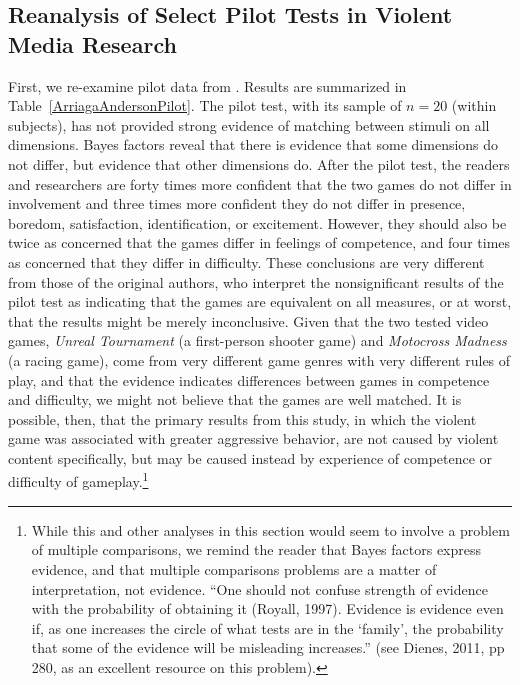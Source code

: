 \documentclass[man]{apa6}
\begin{document}
\subsection{Reanalysis of Select Pilot Tests in Violent Media Research}
First, we re-examine pilot data from \citet{Arriaga:etal:2008}. Results are summarized in Table~\ref{ArriagaAndersonPilot}. The pilot test, with its sample of $n = 20$ (within subjects), has not provided strong evidence of matching between stimuli on all dimensions. Bayes factors reveal that there is evidence that some dimensions do not differ, but evidence that other dimensions do. After the pilot test, the readers and researchers %
are forty times more confident that the two games do not differ in involvement and three times more confident they do not differ in presence, boredom, satisfaction, identification, or excitement. However, they should also be twice as concerned that the games differ in feelings of competence, and four times as concerned that they differ in difficulty. These conclusions are very different from those of the original authors, who interpret the nonsignificant results of the pilot test as indicating that the games are equivalent on all measures, or at worst, that the results might be merely inconclusive. Given that the two tested video games, {\em Unreal Tournament} (a first-person shooter game) and {\em Motocross Madness} (a racing game), come from very different game genres with very different rules of play, and that the evidence indicates differences between games in competence and difficulty, we might not believe that the games are well matched.  It is possible, then, that the primary results from this study, in which the violent game was associated with greater aggressive behavior, %
are not caused by violent content specifically, but may be caused instead by experience of competence or difficulty of gameplay.\footnote{While this and other analyses in this section would seem to involve a problem of multiple comparisons, we remind the reader that Bayes factors express evidence, and that multiple comparisons problems are a matter of interpretation, not evidence. ``One should not confuse strength of evidence with the probability of obtaining it (Royall, 1997). Evidence is evidence even if, as one increases the circle of what tests are in the `family', the probability that some of the evidence will be misleading increases.'' (see Dienes, 2011, pp 280, as an excellent resource on this problem).}
\end{document}
